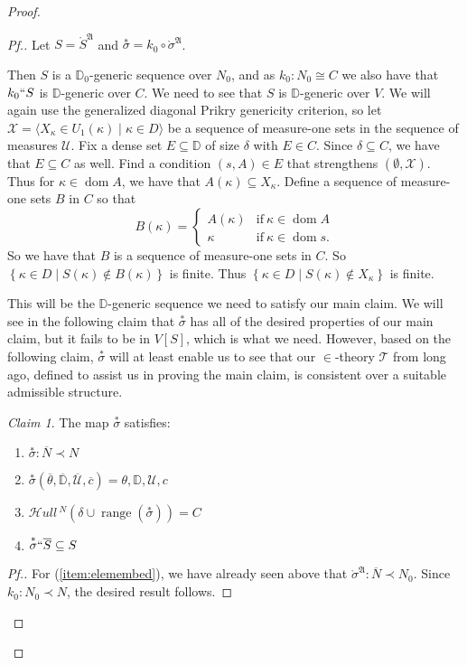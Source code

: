 \documentclass{amsart}
\theoremstyle{definition}
\theoremstyle{remark}
\newtheorem{claimno}{Claim}
\newcommand{\D}{\mathbb{D}}
\newcommand{\N}{{\overline{N}}}
\renewcommand{\S}{{\overline{S}}}
\newcommand{\U}{\mathcal{U}}
\DeclareMathOperator{\ran}{range}
\DeclareMathOperator{\dom}{dom}
\newcommand{\st}{\; | \;}
\newcommand{\set}[2]{\left\{#1\st #2 \right\}}
\newcommand{\seq}[2]{\langle #1 \st #2 \rangle}
\newcommand{\SH}{\mathcal{H}\textit{ull} \,}
\newcommand{\sk}[3]{\SH^{#1}( {#2} \cup {\ran(#3)} ) }
\begin{document}
\begin{proof}
\begin{proof}[Pf.]
Let $S = \mathring{S}^{\mathfrak A}$ and $\overset{*} {\sigma}=k_0 \circ \mathring{\sigma}^{\mathfrak A}$. 

Then $S$ is a $\D_0$-generic sequence over $N_0$, and as $k_0:N_0 \cong C$ we also have that $k_0``S$ is $\D$-generic over $C$. 
We need to see that $S$ is $\D$-generic over $V$. 
We will again use the generalized diagonal Prikry genericity criterion, so let $\mathcal X = \seq{ X_\kappa \in U_1(\kappa) }{ \kappa \in D }$ be a sequence of measure-one sets in the sequence of measures $\U$. Fix a dense set $E \subseteq \D$ of size $\delta$ with $E \in C$. Since $\delta \subseteq C$, we have that $E \subseteq C$ as well. Find a condition $(s,A) \in E$ that strengthens $(\emptyset, \mathcal X)$. Thus for $\kappa \in \dom A$, we have that $A(\kappa) \subseteq X_\kappa$. Define a sequence of measure-one sets $B$ in $C$ so that 
$$B(\kappa) = \begin{cases} A(\kappa) &\text{if} \ \kappa \in \dom A \\ \kappa &\text{if} \ \kappa \in \dom s. \end{cases}$$
So we have that $B$ is a sequence of measure-one sets in $C$. So $\set{ \kappa \in D }{S(\kappa) \notin B(\kappa) }$ is finite. Thus $\set{\kappa \in D}{ S(\kappa) \notin X_\kappa}$ is finite.


This will be the $\D$-generic sequence we need to satisfy our main claim. We will see in the following claim that $\overset{*} \sigma$ has all of the desired properties of our main claim, but it fails to be in $V[S]$, which is what we need. However, based on the following claim, $\overset{*}{\sigma}$ will at least enable us to see that our $\in$-theory $\mathcal T$ from long ago, defined to assist us in proving the main claim, is consistent over a suitable admissible structure.
\begin{claimno} The map $\overset{*}{\sigma}$ satisfies:
\begin{enumerate}
	\item \label{item:elemembed} $\overset{*} {\sigma}: \N \prec N$
	\item \label{item:rangematches} $\overset{*} {\sigma}(\overline \theta, \overline{\D}, \overline{\U}, \overline c)=\theta, \D, \U, c$
	\item \label{item:skolemC} $\sk{N}{\delta}{\overset{*}{\sigma}} = C$	
	\item \label{item:lifts} $\overset{*} {\sigma} `` \S \subseteq S$
\end{enumerate}
\end{claimno}
\begin{proof}[Pf.]
For (\ref{item:elemembed}), we have already seen above that $\mathring \sigma^{\mathfrak A}: \N \prec N_0$. Since $k_0:N_0 \prec N$, the desired result follows.


\end{proof}
\end{proof}
\end{proof}
\end{document}
